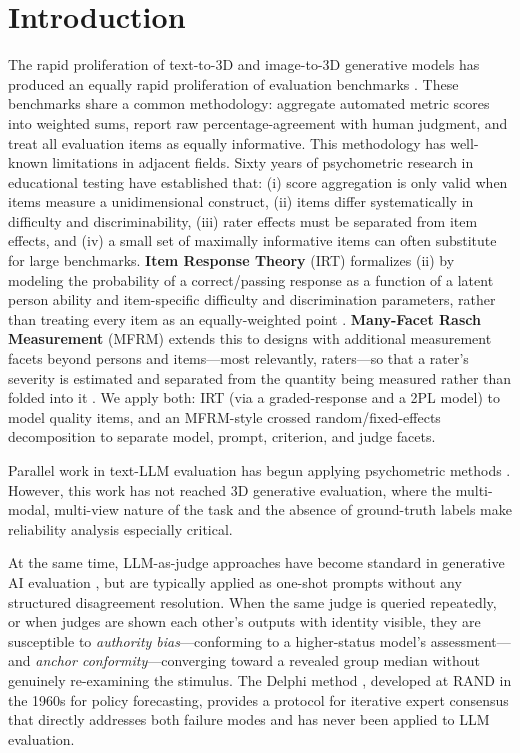 \documentclass[10pt]{article}
\begin{document}
\section{Introduction}
\label{sec:intro}

The rapid proliferation of text-to-3D and image-to-3D generative models has
produced an equally rapid proliferation of evaluation benchmarks
\citep{eval3d2025,hi3deval2025,t3bench2023,gen3deval2024}.
These benchmarks share a common methodology: aggregate automated metric scores
into weighted sums, report raw percentage-agreement with human judgment, and
treat all evaluation items as equally informative.
This methodology has well-known limitations in adjacent fields.
Sixty years of psychometric research in educational testing have established
that: (i) score aggregation is only valid when items measure a unidimensional
construct, (ii) items differ systematically in difficulty and discriminability,
(iii) rater effects must be separated from item effects, and (iv) a small set
of maximally informative items can often substitute for large benchmarks.
\textbf{Item Response Theory} (IRT) formalizes (ii) by modeling the
probability of a correct/passing response as a function of a latent person
ability and item-specific difficulty and discrimination parameters, rather
than treating every item as an equally-weighted point
\citep{embretson2000}. \textbf{Many-Facet Rasch Measurement} (MFRM)
extends this to designs with additional measurement facets beyond
persons and items---most relevantly, raters---so that a rater's severity
is estimated and separated from the quantity being measured rather than
folded into it \citep{linacre1994,eckes2011}. We apply both: IRT (via a
graded-response and a 2PL model) to model quality items, and an
MFRM-style crossed random/fixed-effects decomposition to separate model,
prompt, criterion, and judge facets.

Parallel work in text-LLM evaluation has begun applying psychometric methods
\citep{tinybenchmarks2024}.
However, this work has not reached 3D generative evaluation, where the
multi-modal, multi-view nature of the task and the absence of ground-truth
labels make reliability analysis especially critical.

At the same time, LLM-as-judge approaches have become standard in generative AI
evaluation \citep{llmjudge2023}, but are typically applied as
one-shot prompts without any structured disagreement resolution.
When the same judge is queried repeatedly, or when judges are shown each
other's outputs with identity visible, they are susceptible to
\emph{authority bias}---conforming to a higher-status model's assessment---and
\emph{anchor conformity}---converging toward a revealed group median without
genuinely re-examining the stimulus.
The Delphi method \citep{dalkey1963delphi}, developed at RAND in the 1960s for
policy forecasting, provides a protocol for iterative expert consensus that
directly addresses both failure modes and has never been applied to LLM
evaluation.
\end{document}
